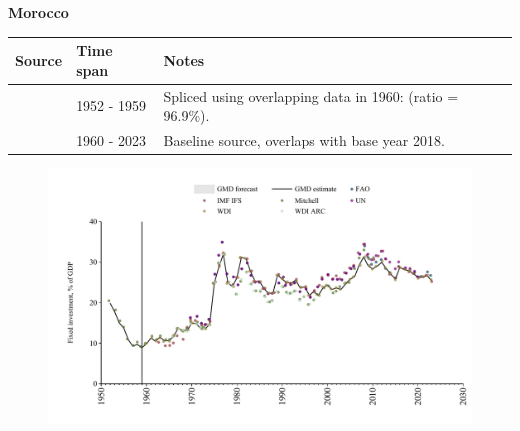 \documentclass[12pt,a4paper,landscape]{article}
\begin{document}
\begin{adjustbox}{max totalsize={\paperwidth}{\paperheight},center}
\begin{minipage}[t][\textheight][t]{\textwidth}
\vspace*{0.5cm}
{}
\begin{center}
{\Large\bfseries Morocco}
\end{center}
\vspace{0.5cm}
\begin{table}[H]
\centering
\small
\begin{tabular}{|l|l|l|}
\hline
\textbf{Source} & \textbf{Time span} & \textbf{Notes} \\
\hline
\rowcolor{white}\cite{Mitchell}& 1952 - 1959 &Spliced using overlapping data in 1960: (ratio = 96.9\%).\\
\rowcolor{lightgray}\cite{WDI}& 1960 - 2023 &Baseline source, overlaps with base year 2018.\\
\hline
\end{tabular}
\end{table}
\begin{figure}[H]
\centering
\includegraphics[width=\textwidth,height=0.6\textheight,keepaspectratio]{graphs/MAR_finv_GDP.pdf}
\end{figure}
\end{minipage}
\end{adjustbox}
\end{document}
